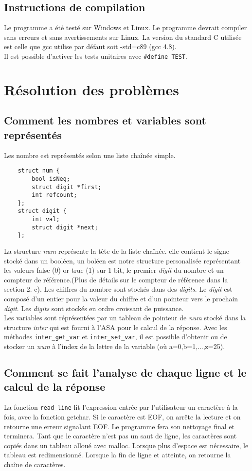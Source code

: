 \documentclass[a4paper,12pt,french]{article}
\begin{document}
	\subsection{Instructions de compilation}
	Le programme a été testé sur Windows et Linux. Le programme devrait compiler
	sans erreurs et sans avertissements sur Linux. La version du standard C
	utilisée est celle que gcc utilise par défaut soit -std=c89 (gcc 4.8).\\
	
	Il est possible d'activer les tests unitaires avec \lstinline$#define TEST$.
	\newpage
\section{Résolution des problèmes}
	\renewcommand{\thesubsection}{(\alph{subsection})}

	\subsection{Comment les nombres et variables sont représentés}
		Les nombre est représentés selon une liste chaînée simple.
\begin{lstlisting}
	struct num {
	    bool isNeg;
	    struct digit *first;
	    int refcount;
	};
	struct digit {
	    int val;
	    struct digit *next;
	};
\end{lstlisting}
		La structure \textit{num} représente la tête de la liste chaînée. elle contient le signe stocké dans un booléen, un boléen est notre structure personalisée représentant les valeurs \og false \fg{}(0) or \og true \fg{}(1) sur 1 bit, le premier \textit{digit} du nombre et un compteur de référence.(Plus de détails sur le compteur de référence dans la section 2. c). Les chiffres du nombre sont stockés dans des \textit{digits}. Le \textit{digit} est composé d'un entier pour la valeur du chiffre et d'un pointeur vers le prochain \textit{digit}. Les \textit{digits} sont stockés en ordre croissant de puissance.\\
		
		Les variables sont réprésentées par un tableau de pointeur de \textit{num} stocké dans la structure \textit{inter} qui est fourni à l'ASA pour le calcul de la réponse. Avec les méthodes \lstinline$inter_get_var$ et \lstinline$inter_set_var$, il est possible d'obtenir ou de stocker un \textit{num} à l'index de la lettre de la variable (où a=0,b=1,...,z=25).
		\subsection{Comment se fait l’analyse de chaque ligne et le calcul de la réponse}
		La fonction \lstinline$read_line$ lit l'expression entrée par l'utilisateur un caractère à la fois,
		avec la fonction getchar. Si le caractère est EOF, on arrête la lecture et on retourne
		une erreur signalant EOF. Le programme fera son nettoyage final et terminera. Tant que
		le caractère n'est pas un saut de ligne, les caractères sont copiés dans un tableau
		alloué avec malloc. Lorsque plus d'espace est nécessaire, le tableau est redimensionné.
		Lorsque la fin de ligne et atteinte, on retourne la chaîne de caractères.\\
		
\end{document}
